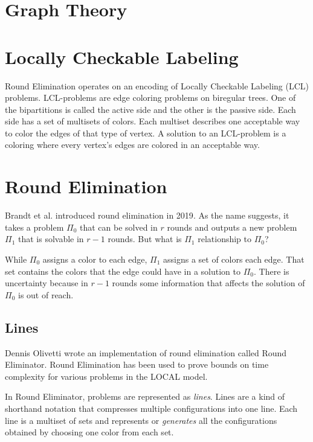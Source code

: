 \documentclass[english, 12pt, a4paper, sci, utf8, a-1b, online]{aaltothesis}
\begin{document}
\section{Graph Theory}

\section{Locally Checkable Labeling}

Round Elimination operates on an encoding of Locally Checkable Labeling (LCL) problems. LCL-problems are edge coloring problems on biregular trees. One of the bipartitions is called the active side and the other is the passive side. Each side has a set of multisets of colors. Each multiset describes one acceptable way to color the edges of that type of vertex. A solution to an LCL-problem is a coloring where every vertex's edges are colored in an acceptable way.


\section{Round Elimination}

Brandt et al. introduced round elimination in 2019\cite{speedup}. As the name suggests, it takes a problem $\Pi_0$ that can be solved in $r$ rounds and outputs a new problem $\Pi_1$ that is solvable in $r-1$ rounds. But what is $\Pi_1$ relationship to $\Pi_0$?

While $\Pi_0$ assigns a color to each edge, $\Pi_1$ assigns a set of colors each edge. That set contains the colors that the edge could have in a solution to $\Pi_0$. There is uncertainty because in $r-1$ rounds some information that affects the solution of $\Pi_0$ is out of reach.

\subsection{Lines}

Dennis Olivetti wrote an implementation of round elimination called Round Eliminator\cite{RE}. Round Elimination has been used to prove bounds on time complexity for various problems in the LOCAL model\cite{tc1, tc2, tc3}.

In Round Eliminator, problems are represented as \emph{lines}. Lines are a kind of shorthand notation that compresses multiple configurations into one line. Each line is a multiset of sets and represents or \emph{generates} all the configurations obtained by choosing one color from each set.\cite{RE}
\end{document}

